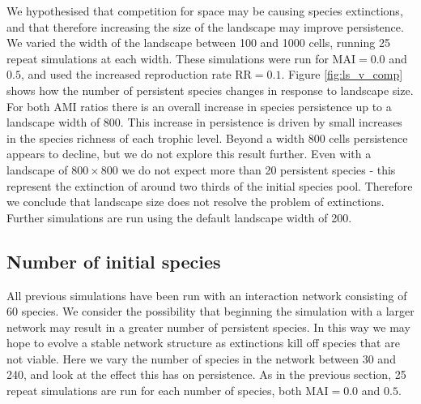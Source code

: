 We hypothesised that competition for space may be causing species extinctions, and that therefore increasing the size of the landscape may improve persistence. We varied the width of the landscape between 100 and 1000 cells, running 25 repeat simulations at each width. These simulations were run for MAI$=0.0$ and $0.5$, and used the increased reproduction rate RR$=0.1$. Figure \ref{fig:ls_v_comp} shows how the number of persistent species changes in response to landscape size. For both AMI ratios there is an overall increase in species persistence up to a landscape width of 800. This increase in persistence is driven by small increases in the species richness of each trophic level. Beyond a width 800 cells persistence appears to decline, but we do not explore this result further. Even with a landscape of $800 \times 800$ we do not expect more than 20 persistent species - this represent the extinction of around two thirds of the initial species pool. Therefore we conclude that landscape size does not resolve the problem of extinctions. Further simulations are run using the default landscape width of 200. 

\newpage
\subsection{Number of initial species}
\label{sec:numsp_vp}

All previous simulations have been run with an interaction network consisting of 60 species. We consider the possibility that beginning the simulation with a larger network may result in a greater number of persistent species. In this way we may hope to evolve a stable network structure as extinctions kill off species that are not viable. Here we vary the number of species in the network between 30 and 240, and look at the effect this has on persistence. As in the previous section, 25 repeat simulations are run for each number of species, both MAI$=0.0$ and $0.5$.
 
